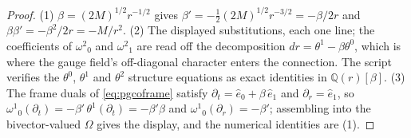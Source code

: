 \documentclass[11pt]{article}
\theoremstyle{definition}
\begin{document}
\begin{proof}
(1) $\beta = (2M)^{1/2} r^{-1/2}$ gives $\beta' = -\tfrac12 (2M)^{1/2} r^{-3/2} = -\beta/2r$ and $\beta\beta' = -\beta^2/2r = -M/r^2$. (2) The displayed substitutions, each one line; the coefficients of $\omega^2{}_0$ and $\omega^2{}_1$ are read off the decomposition $dr = \theta^1 - \beta\theta^0$, which is where the gauge field's off-diagonal character enters the connection. The script verifies the $\theta^0$, $\theta^1$ and $\theta^2$ structure equations as exact identities in $\mathbb{Q}(r)[\beta]$. (3) The frame duals of \eqref{eq:pgcoframe} satisfy $\partial_t = \hat e_0 + \beta\,\hat e_1$ and $\partial_r = \hat e_1$, so $\omega^1{}_0(\partial_t) = -\beta'\,\theta^1(\partial_t) = -\beta'\beta$ and $\omega^1{}_0(\partial_r) = -\beta'$; assembling into the bivector-valued $\Omega$ gives the display, and the numerical identities are (1).
\end{proof}
\end{document}
